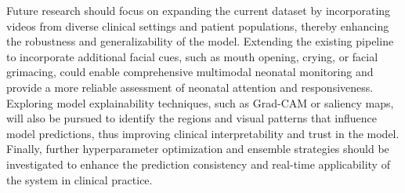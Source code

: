 \documentclass[runningheads]{llncs}
\begin{document}
Future research should focus on expanding the current dataset by incorporating videos from diverse clinical settings and patient populations, thereby enhancing the robustness and generalizability of the model. Extending the existing pipeline to incorporate additional facial cues, such as mouth opening, crying, or facial grimacing, could enable comprehensive multimodal neonatal monitoring and provide a more reliable assessment of neonatal attention and responsiveness. Exploring model explainability techniques, such as Grad-CAM or saliency maps, will also be pursued to identify the regions and visual patterns that influence model predictions, thus improving clinical interpretability and trust in the model. Finally, further hyperparameter optimization and ensemble strategies should be investigated to enhance the prediction consistency and real-time applicability of the system in clinical practice.
\end{document}
